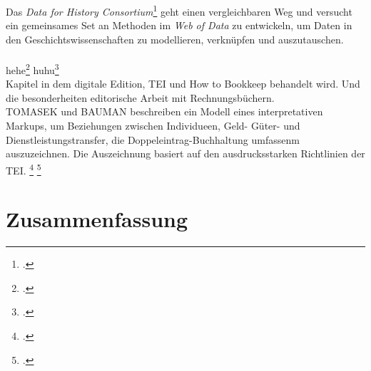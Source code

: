 \documentclass[12pt,a4paper]{article}
\begin{document}
Das \textit{Data for History Consortium}\footcite{beretta2017dataforhistory} geht einen vergleichbaren Weg und versucht ein gemeinsames Set an Methoden im \textit{Web of Data} zu entwickeln, um Daten in den Geschichtswissenschaften zu modellieren, verknüpfen und auszutauschen.
\\
\\
hehe\footcite[Vgl.][]{sahle2013digitale}
huhu\footcite[Vgl][S.234-252]{jannidis2017digital} 
\\
Kapitel in dem digitale Edition, TEI und How to Bookkeep behandelt wird. Und die besonderheiten editorische Arbeit mit Rechnungsbüchern. 
\\
TOMASEK und BAUMAN beschreiben ein Modell eines interpretativen Markups, um Beziehungen zwischen Individueen, Geld- Güter- und Dienstleistungstransfer, die Doppeleintrag-Buchhaltung umfassenm auszuzeichnen. Die Auszeichnung basiert auf den ausdrucksstarken Richtlinien der TEI. \footcite[Vgl.][S.1-2, \protect\url{http://journals.openedition.org/jtei/895}, 08.03.2018]{tomasek2013encoding}
\footcite[][S.41-44]{kobler2010qualitat}


\section{Zusammenfassung}

\newpage


\newpage
\listoffigures
\end{document}
